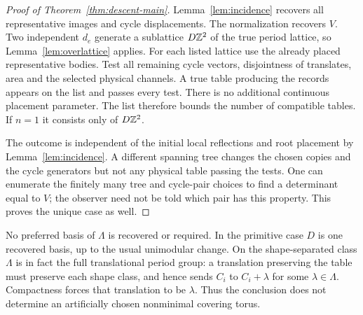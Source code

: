 \begin{proof}[Proof of Theorem~\ref{thm:descent-main}]
Lemma~\ref{lem:incidence} recovers all representative images and cycle
displacements. The normalization recovers $V$. Two independent $d_e$
generate a sublattice $D\mathbb Z^2$ of the true period lattice, so
Lemma~\ref{lem:overlattice} applies. For each listed lattice use the
already placed representative bodies. Test all remaining cycle vectors,
disjointness of translates, area and the selected physical channels.
A true table producing the records appears on the list and passes every
test. There is no additional continuous placement parameter. The list
therefore bounds the number of compatible tables. If $n=1$ it consists
only of $D\mathbb Z^2$.

The outcome is independent of the initial local reflections and root
placement by Lemma~\ref{lem:incidence}. A different spanning tree changes
the chosen copies and the cycle generators but not any physical table
passing the tests. One can enumerate the finitely many tree and cycle-pair
choices to find a determinant equal to $V$; the observer need not be told
which pair has this property. This proves the unique case as well.
\end{proof}

\begin{remark}
No preferred basis of $\Lambda$ is recovered or required. In the primitive
case $D$ is one recovered basis, up to the usual unimodular change. On the
shape-separated class $\Lambda$ is in fact the full translational period
group: a translation preserving the table must preserve each shape class,
and hence sends $C_i$ to $C_i+\lambda$ for some $\lambda\in\Lambda$.
Compactness forces that translation to be $\lambda$. Thus the conclusion
does not determine an artificially chosen nonminimal covering torus.
\end{remark}

